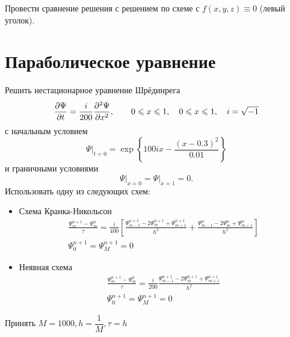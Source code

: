 \documentclass[10pt]{article}
\begin{document}
Провести сравнение решения с решением по схеме с $f(x,y,z) \equiv 0$ (левый уголок).

\section{Параболическое уравнение}
Решить нестационарное уравнение Шрёдинрега
\[
\frac{\partial \Psi}{\partial t} = \frac{i}{200} \frac{\partial {}^2\Psi}{\partial x^2}, \qquad 0 \leqslant x \leqslant
1,\quad 0 \leqslant x \leqslant 1, \quad i = \sqrt{-1}
\]
с начальным условием
\[
\Psi\big|_{t = 0} = \exp\left\{100ix - \frac{(x-0.3)^2}{0.01}\right\}
\]
и граничными условиями
\[
\Psi\big|_{x=0} = \Psi\big|_{x=1} = 0.
\]
Использовать одну из следующих схем:
\begin{itemize}
\item Схема Кранка-Никольсон
\begin{gather*}
\frac{\Psi^{n+1}_m - \Psi^{n}_m}{\tau} = \frac{i}{400}
\left[
\frac{\Psi^{n+1}_{m-1} -2\Psi^{n+1}_m + \Psi^{n+1}_{m+1}}{h^2} + 
\frac{\Psi^n_{m-1} -2\Psi^n_m + \Psi^n_{m+1}}{h^2}\right]\\
\Psi^{n+1}_0 = \Psi^{n+1}_M = 0
\end{gather*}
\item Неявная схема
\begin{gather*}
\frac{\Psi^{n+1}_m - \Psi^{n}_m}{\tau} = \frac{i}{200}
\frac{\Psi^{n+1}_{m-1} -2\Psi^{n+1}_m + \Psi^{n+1}_{m+1}}{h^2}\\
\Psi^{n+1}_0 = \Psi^{n+1}_M = 0
\end{gather*}
\end{itemize}
Принять $M = 1000, h = \dfrac{1}{M}, \tau = h$
\end{document}
